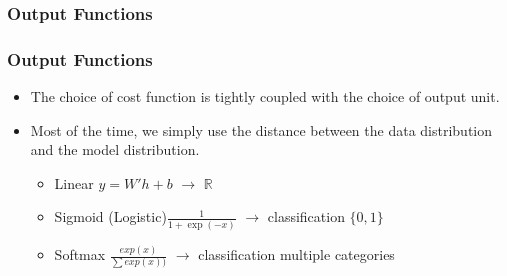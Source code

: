 \documentclass[
  shownotes,
  xcolor={svgnames},
  hyperref={colorlinks,citecolor=DarkBlue,linkcolor=DarkRed,urlcolor=DarkBlue}
  , aspectratio=169]{beamer}
\begin{document}
\subsubsection{Output Functions}
\begin{frame}
\frametitle{Output Functions}

\begin{itemize}
\item The choice of cost function is tightly coupled with the choice of output unit. 
\medskip
\item Most of the time, we simply use the distance between the data distribution and the model distribution. 
\medskip
\begin{itemize}

    \item Linear $y=W'h +b$ $\rightarrow$  $\mathbb{R}$
    \medskip
    \item Sigmoid (Logistic)$\frac{1}{1 + \exp(-x)}$ $\rightarrow$ classification $\{0,1\}$
    \medskip
    \item Softmax $\frac{exp(x)}{\sum exp(x))}$ $\rightarrow$ classification multiple categories
\end{itemize}
\end{itemize}

\end{frame}


\end{document}
